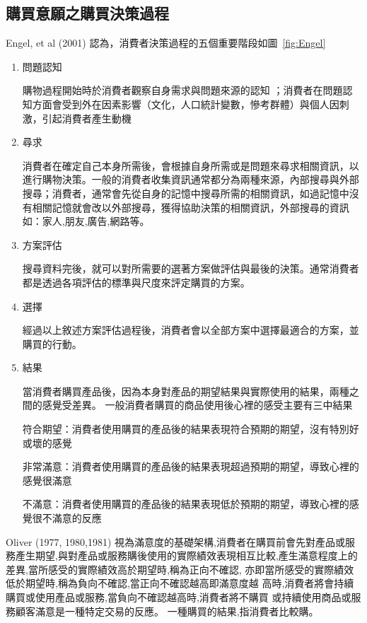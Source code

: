 \subsection{購買意願之購買決策過程}
Engel, et al (2001) 認為，消費者決策過程的五個重要階段如圖~\ref{fig:Engel}
\begin{enumerate}
\item 問題認知

購物過程開始時於消費者觀察自身需求與問題來源的認知 ；消費者在問題認知方面會受到外在因素影響（文化，人口統計變數，慘考群體）與個人因刺激，引起消費者產生動機

\item 尋求

消費者在確定自己本身所需後，會根據自身所需或是問題來尋求相關資訊，以進行購物決策。一般的消費者收集資訊通常都分為兩種來源，內部搜尋與外部搜尋；消費者，通常會先從自身的記憶中搜尋所需的相關資訊，如過記憶中沒有相關記憶就會改以外部搜尋，獲得協助決策的相關資訊，外部搜尋的資訊如：家人,朋友,廣告,網路等。
           
\item 方案評估

搜尋資料完後，就可以對所需要的選著方案做評估與最後的決策。通常消費者都是透過各項評估的標準與尺度來評定購買的方案。

\item 選擇

經過以上敘述方案評估過程後，消費者會以全部方案中選擇最適合的方案，並購買的行動。

\item 結果 

當消費者購買產品後，因為本身對產品的期望結果與實際使用的結果，兩種之間的感覺受差異。
一般消費者購買的商品使用後心裡的感受主要有三中結果

符合期望：消費者使用購買的產品後的結果表現符合預期的期望，沒有特別好或壞的感覺

非常滿意：消費者使用購買的產品後的結果表現超過預期的期望，導致心裡的感覺很滿意

不滿意：消費者使用購買的產品後的結果表現低於預期的期望，導致心裡的感覺很不滿意的反應
\end{enumerate}

Oliver (1977, 1980,1981) \cite{Oliver1980}視為滿意度的基礎架構,消費者在購買前會先對產品或服務產生期望,與對產品或服務購後使用的實際績效表現相互比較,產生滿意程度上的差異,當所感受的實際績效高於期望時,稱為正向不確認, 亦即當所感受的實際績效低於期望時,稱為負向不確認,當正向不確認越高即滿意度越 高時,消費者將會持續購買或使用產品或服務,當負向不確認越高時,消費者將不購買 或持續使用商品或服務顧客滿意是一種特定交易的反應。 一種購買的結果,指消費者比較購。



